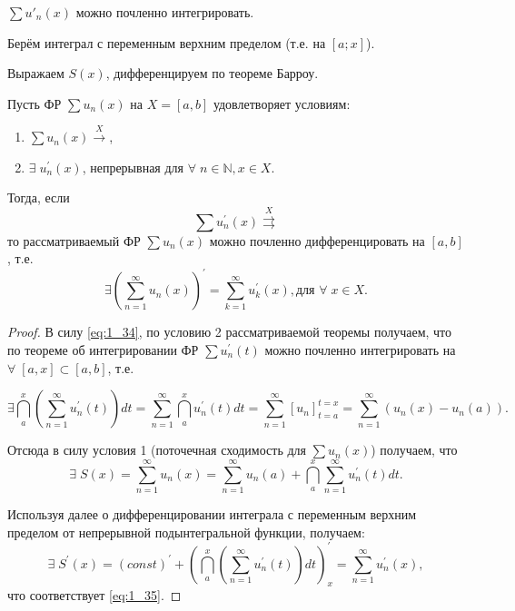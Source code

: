 \begin{plan}
\item $\sum u'_n(x)$ можно почленно интегрировать.
\item Берём интеграл с переменным верхним пределом (т.е. на $[a; x]$).
\item Выражаем $S(x)$, дифференцируем по теореме Барроу.
\end{plan}
\begin{theorem}
	Пусть ФР $\sum u_n(x)$ на $X = [a,b]$ удовлетворяет условиям:
	\begin{enumerate}
		\item $\sum u_n(x) \overset{X}{\rightarrow}$,
		\item $\exists \; u_n^{'}(x)$, непрерывная для $\forall \; n \in \mathbb{N}, x \in X$.
	\end{enumerate}
	Тогда, если
    \begin{equation}
        \label{eq:1_34}
        \sum u_n^{'}(x) \overset{X}{\rightrightarrows}
    \end{equation}
    то рассматриваемый ФР $\sum u_n(x)$ можно почленно дифференцировать на $[a,b]$, т.е.
	\begin{equation}
	\label{eq:1_35}
	\exists \left( \sum_{n=1}^{\infty} u_n (x) \right)^{'} = \sum_{k=1}^{\infty} u_k^{'}(x), \text{для }\forall \; x \in X.
	\end{equation}
\end{theorem}
\begin{proof}
	В силу \eqref{eq:1_34}, по условию 2 рассматриваемой теоремы получаем, что по теореме об интегрировании ФР $\sum u_n^{'}(t)$ можно почленно интегрировать на
    	$\forall \; [a,x] \subset [a,b]$, \nolinebreak т.е.

    \begin{equation*}
        \exists \dint\limits_a^x \left(\sum\limits_{n=1}^{\infty} u_n^{'}(t)\right)dt = \sum_{n=1}^{\infty} \dint\limits_a^x u_n^{'}(t)dt = \sum_{n=1}^{\infty} [u_n]^{t = x}_{t = a} = \sum\limits_{n=1}^{\infty}\left(u_n(x) - u_n(a)\right).
    \end{equation*}

	Отсюда в силу условия 1 (поточечная сходимость для $\sum u_n(x)$) получаем, что
    \begin{equation*}
            \exists \; S(x) = \sum\limits_{n=1}^{\infty} u_n(x) = \sum\limits_{n=1}^{\infty}u_n(a) + \dint\limits_a^x \sum\limits_{n=1}^{\infty}u_n^{'}(t)dt.
    \end{equation*}

	Используя далее  о дифференцировании интеграла с переменным верхним пределом от непрерывной подынтегральной функции, получаем:\\
	\begin{equation*}
	\exists \; S^{'}(x) = (const)^{'} + \left(\dint\limits_a^x \left( \sum\limits_{n=1}^{\infty} u_n^{'} (t) \right)dt \right)^{'}_x = \sum\limits_{n=1}^{\infty}u_n^{'} (x),
	\end{equation*} что соответствует \eqref{eq:1_35}.
\end{proof}
